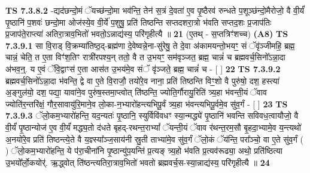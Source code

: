 \documentclass[17pt]{extarticle}
\begin{document}
                  \newline
                                \textbf{ TS 7.3.8.2} \newline
                  -द्यद॑छन्दो॒मं ॅयच्छ॑न्दो॒मा भव॑न्ति॒ तेन॑ स॒त्रं दे॒वता॑ ए॒व पृ॒ष्ठैरव॑ रुन्धते प॒शूञ्छ॑न्दो॒मैरोजो॒ वै वी॒र्यं॑ पृ॒ष्ठानि॑ प॒शवः॑ छन्दो॒मा ओज॑स्ये॒व वी॒र्ये॑ प॒शुषु॒ प्रति॑ तिष्ठन्ति सप्तदशरा॒त्रो भ॑वति सप्तद॒शः प्र॒जाप॑तिः प्र॒जाप॑ते॒राप्त्या॑ अतिरा॒त्राव॒भितो॑ भवतो॒ऽन्नाद्य॑स्य॒ परि॑गृहीत्यै ॥ \textbf{  21} \newline
                  \newline
                      (ए॒तथ् - स॒प्तत्रिꣳ॑शच्च)  \textbf{(A8)} \newline \newline
                                        \textbf{ TS 7.3.9.1} \newline
                  सा वि॒राड् वि॒क्रम्या॑तिष्ठ॒द्-ब्रह्म॑णा दे॒वेष्वन्ने॒ना-सु॑रेषु॒ ते दे॒वा अ॑कामयन्तो॒भयꣳ॒॒ सं ॅवृ॑ञ्जीमहि॒ ब्रह्म॒ चान्नं॒ चेति॒ त ए॒ता विꣳ॑श॒तिꣳ रात्री॑रपश्य॒न् ततो॒ वै त उ॒भयꣳ॒॒ सम॑वृञ्जत॒ ब्रह्म॒ चान्नं॑ च ब्रह्मवर्च॒सिनो᳚ऽन्ना॒दा अ॑भव॒न्॒. य ए॒वं ॅवि॒द्वाꣳस॑ ए॒ता आस॑त उ॒भय॑मे॒व संॅ वृ॑ञ्जते॒ ब्रह्म॒ चान्नं॑ च - [  ] \textbf{  22} \newline
                  \newline
                                \textbf{ TS 7.3.9.2} \newline
                  ब्रह्मवर्च॒सिनो᳚ऽन्ना॒दा भ॑वन्ति॒ द्वे वा ए॒ते वि॒राजौ॒ तयो॑रे॒व नाना॒ प्रति॑ तिष्ठन्ति विꣳ॒॒शो वै पुरु॑षो॒ दश॒ हस्त्या॑ अ॒ङ्गुल॑यो॒ दश॒ पद्या॒ यावा॑ने॒व पुरु॑ष॒स्तमा॒प्त्वोत् ति॑ष्ठन्ति॒ ज्योति॒र्गौरायु॒रिति॑ त्र्य॒हा भ॑वन्ती॒यं ॅवाव ज्योति॑र॒न्तरि॑क्षं॒ गौर॒सावायु॑रि॒माने॒व लो॒का-न॒भ्यारो॑हन्त्यभिपू॒र्वं त्र्य॒हा भ॑वन्त्यभिपू॒र्वमे॒व सु॑व॒र्गं - [  ] \textbf{  23} \newline
                  \newline
                                \textbf{ TS 7.3.9.3} \newline
                  ॅलो॒कम॒भ्यारो॑हन्ति॒ यद॒न्यतः॑ पृ॒ष्ठानि॒ स्युर्विवि॑वधꣳ स्या॒न्मद्ध्ये॑ पृ॒ष्ठानि॑ भवन्ति सविवध॒त्वायौजो॒ वै वी॒र्यं॑ पृ॒ष्ठान्योज॑ ए॒व वी॒र्यं॑ मद्ध्य॒तो द॑धते बृहद्-रथन्त॒राभ्यां᳚ ॅयन्ती॒यं ॅवाव र॑थन्त॒रम॒सौ बृ॒हदा॒भ्यामे॒व य॒न्त्यथो॑ अ॒नयो॑रे॒व प्रति॑ तिष्ठन्त्ये॒ते वै य॒ज्ञ्स्या᳚ञ्ज॒साय॑नी स्रु॒ती ताभ्या॑मे॒व सु॑व॒र्गं ॅलो॒कं ॅय॑न्ति॒ परा᳚ञ्चो॒ वा ए॒ते सु॑व॒र्गं ( ) ॅलो॒कम॒भ्यारो॑हन्ति॒ ये प॑रा॒चीना॑नि पृ॒ष्ठान्यु॑प॒यन्ति॑ प्र॒त्यङ् त्र्य॒हो भ॑वति प्र॒त्यव॑रूढ्या॒ अथो॒ प्रति॑ष्ठित्या उ॒भयो᳚र्लो॒कयोर्॑. ऋ॒द्ध्वोत् ति॑ष्ठन्त्यतिरा॒त्राव॒भितो॑ भवतो ब्रह्मवर्च॒स-स्या॒न्नाद्य॑स्य॒ परि॑गृहीत्यै ॥ \textbf{  24 } \newline
\end{document}
